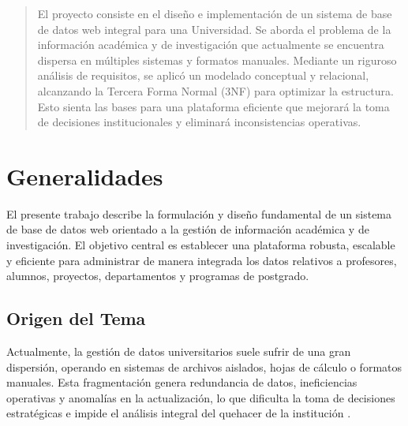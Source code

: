 \documentclass[a0,portrait]{a0poster}
\begin{document}


\begin{multicols}{3} %

\begin{abstract}
El proyecto consiste en el diseño e implementación de un sistema de base de datos web integral para una Universidad. Se aborda el problema de la información académica y de investigación que actualmente se encuentra dispersa en múltiples sistemas y formatos manuales. Mediante un riguroso análisis de requisitos, se aplicó un modelado conceptual y relacional, alcanzando la Tercera Forma Normal (3NF) para optimizar la estructura. Esto sienta las bases para una plataforma eficiente que mejorará la toma de decisiones institucionales y eliminará inconsistencias operativas.
\end{abstract}


\color{negro}
\section*{Generalidades}

El presente trabajo describe la formulación y diseño fundamental de un sistema de base de datos web orientado a la gestión de información académica y de investigación. El objetivo central es establecer una plataforma robusta, escalable y eficiente para administrar de manera integrada los datos relativos a profesores, alumnos, proyectos, departamentos y programas de postgrado.




\subsection*{Origen del Tema}
Actualmente, la gestión de datos universitarios suele sufrir de una gran dispersión, operando en sistemas de archivos aislados, hojas de cálculo o formatos manuales. Esta fragmentación genera redundancia de datos, ineficiencias operativas y anomalías en la actualización, lo que dificulta la toma de decisiones estratégicas e impide el análisis integral del quehacer de la institución \cite{silberschatz2014fundamentos}.


\end{multicols}
\end{document}
